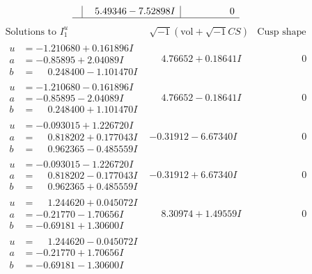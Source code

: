 \documentclass[1p]{elsarticle_modified}
\theoremstyle{definition}
\newcommand{\I}{\sqrt{-1}}
\begin{document}
$$\begin{array}{c|c|c}
 & \phantom{-}5.49346 - 7.52898 I & \phantom{-0.000000 } 0\\
 \hline 
 \end{array}$$\newpage$$\begin{array}{c|c|c}  
\text{Solutions to }I^u_{1}& \I (\text{vol} + \sqrt{-1}CS) & \text{Cusp shape}\\
 \hline 
\begin{aligned}
u &= -1.210680 + 0.161896 I \\
a &= -0.85895 + 2.04089 I \\
b &= \phantom{-}0.248400 - 1.101470 I\end{aligned}
 & \phantom{-}4.76652 + 0.18641 I & \phantom{-0.000000 } 0 \\ \hline\begin{aligned}
u &= -1.210680 - 0.161896 I \\
a &= -0.85895 - 2.04089 I \\
b &= \phantom{-}0.248400 + 1.101470 I\end{aligned}
 & \phantom{-}4.76652 - 0.18641 I & \phantom{-0.000000 } 0 \\ \hline\begin{aligned}
u &= -0.093015 + 1.226720 I \\
a &= \phantom{-}0.818202 + 0.177043 I \\
b &= \phantom{-}0.962365 - 0.485559 I\end{aligned}
 & -0.31912 - 6.67340 I & \phantom{-0.000000 } 0 \\ \hline\begin{aligned}
u &= -0.093015 - 1.226720 I \\
a &= \phantom{-}0.818202 - 0.177043 I \\
b &= \phantom{-}0.962365 + 0.485559 I\end{aligned}
 & -0.31912 + 6.67340 I & \phantom{-0.000000 } 0 \\ \hline\begin{aligned}
u &= \phantom{-}1.244620 + 0.045072 I \\
a &= -0.21770 - 1.70656 I \\
b &= -0.69181 + 1.30600 I\end{aligned}
 & \phantom{-}8.30974 + 1.49559 I & \phantom{-0.000000 } 0 \\ \hline\begin{aligned}
u &= \phantom{-}1.244620 - 0.045072 I \\
a &= -0.21770 + 1.70656 I \\
b &= -0.69181 - 1.30600 I\end{aligned}

\end{array}$$
\end{document}
